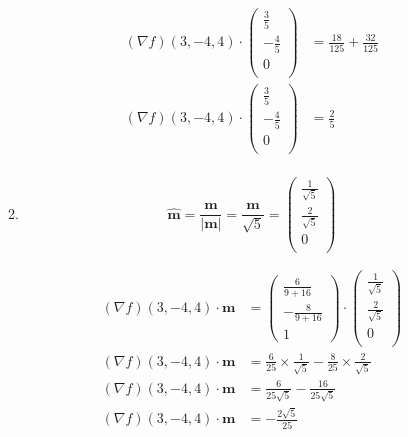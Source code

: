 \documentclass[10pt,\jkfside,a4paper]{article}
\begin{document}
\begin{enumerate}
\begin{enumerate}
\begin{equation}
\begin{split}
(\nabla f)(3, -4, 4)\cdot\begin{pmatrix}\frac{3}{5} \\ -\frac{4}{5} \\ 0 \\ \end{pmatrix} &= \frac{18}{125} + \frac{32}{125} \\
(\nabla f)(3, -4, 4)\cdot\begin{pmatrix}\frac{3}{5} \\ -\frac{4}{5} \\ 0 \\ \end{pmatrix} &= \frac{2}{5} \\
\end{split}
\end{equation}

\item
\begin{equation}
\hat{\mathbf{m}} = \frac{\mathbf{m}}{|\mathbf{m}|} = \frac{\mathbf{m}}{\sqrt{5}} = \begin{pmatrix} \frac{1}{\sqrt{5}} \\ \frac{2}{\sqrt{5}} \\ 0 \\ \end{pmatrix}
\end{equation}

\begin{equation}
\begin{split}
(\nabla f)(3, -4, 4)\cdot \mathbf{m} &= \begin{pmatrix}\frac{6}{9 + 16} \\ -\frac{8}{9 + 16} \\ 1\end{pmatrix}\cdot\begin{pmatrix} \frac{1}{\sqrt{5}} \\ \frac{2}{\sqrt{5}} \\ 0 \\ \end{pmatrix} \\
(\nabla f)(3, -4, 4)\cdot \mathbf{m} &= \frac{6}{25}\times\frac{1}{\sqrt{5}} - \frac{8}{25}\times\frac{2}{\sqrt{5}} \\
(\nabla f)(3, -4, 4)\cdot \mathbf{m} &= \frac{6}{25\sqrt{5}} - \frac{16}{25\sqrt{5}} \\
(\nabla f)(3, -4, 4)\cdot \mathbf{m} &= -\frac{2\sqrt{5}}{25} \\
\end{split}
\end{equation}


\end{enumerate}
\end{enumerate}
\end{document}
